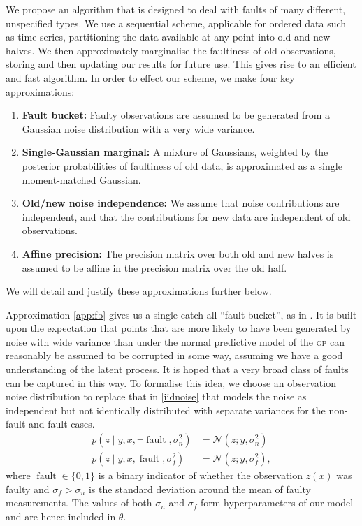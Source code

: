 \documentclass{article} %
\newcommand{\deq}{=}
\newcommand{\given}{\!\ensuremath{\mid}\!}
\newcommand{\cm}[1]{\ensuremath{\mathcal{#1}}}
\newcommand{\acro}[1]{\textsc{#1}}
\DeclareMathOperator{\fault}{fault}
\begin{document}
We propose an algorithm that is designed to deal with faults of many different, unspecified types. We use a sequential scheme, applicable for ordered data such as time series, partitioning the data available at any point into old and new halves.  We then approximately marginalise the faultiness of old observations, storing and then updating our results for future use. This gives rise to an efficient and fast algorithm. In order to effect our scheme, we make four key approximations:
\begin{enumerate}
 \item \label{app:fb} {\bf Fault bucket:} Faulty observations are assumed to be generated from a Gaussian noise distribution with a very wide variance.
\item \label{app:single_gaussian} {\bf Single-Gaussian marginal:} A mixture of Gaussians, weighted by the posterior probabilities of faultiness of old data, is approximated as a single moment-matched Gaussian.
\item \label{app:independence} {\bf Old/new noise independence:} We assume that noise contributions are independent, and that the contributions for new data are independent of old observations.
\item \label{app:affine} {\bf Affine precision:} The precision matrix over both old and new halves is assumed to be affine in the precision matrix over the old half.
\end{enumerate}
We will detail and justify these approximations further below.

Approximation \ref{app:fb} gives us a single catch-all ``fault bucket'', as in \cite{Dereszynski}. It is built upon the expectation that points that are more likely to have been generated by noise with wide variance than under the normal
predictive model of the \acro{gp} can reasonably be assumed to
be corrupted in some way, assuming we have a good understanding of the
latent process. It is hoped that a very broad class of faults can be
captured in this way. 
To formalise this idea, we choose an observation noise distribution to
replace that in \eqref{iidnoise} that models the noise as independent
but not identically distributed with separate variances for the
non-fault and fault cases.
\begin{align*}
 p(z \given y, x, \neg\fault, \sigma_n^2)
 &
 \deq
 \cm{N}(z; y, \sigma_n^2)
 \\
 p(z \given y, x, \fault, \sigma_f^2)
 &
 \deq
 \cm{N}(z; y, \sigma_f^2),
\end{align*}
where $\fault \in \lbrace 0, 1 \rbrace$ is a binary indicator of
whether the observation $z(x)$ was faulty and $\sigma_f > \sigma_n$ is
the standard deviation around the mean of faulty measurements.  The
values of both $\sigma_n$ and $\sigma_f$ form hyperparameters of our
model and are hence included in $\theta$.
\end{document}

